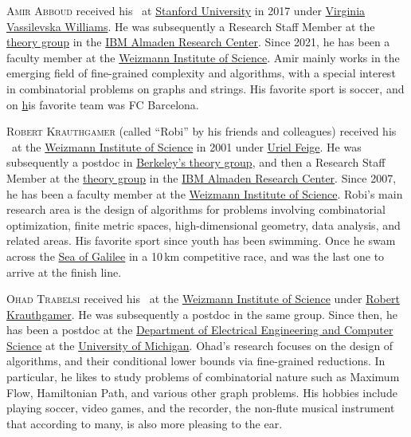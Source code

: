 \documentclass{toc}
\theoremstyle{plain}
\begin{document}
%
%
%
%
%
%
%
%
%
%
%
%
%
%
\begin{tocaboutauthors}
\begin{tocabout}[abboud]  %
\textsc{Amir Abboud} received his \phd\ at
\href{https://www.stanford.edu/}{Stanford University} in 2017 under
\href{https://people.csail.mit.edu/virgi/}{Virginia Vassilevska
Williams}.
He was subsequently a Research Staff Member at the
\href{http://www.almaden.ibm.com/software/disciplines/pm/}{theory
group} in the \href{http://www.almaden.ibm.com/}{IBM Almaden Research
  Center}. Since 2021, he
%
has been  %
a faculty member at the
\href{http://www.weizmann.ac.il/}{Weizmann Institute of Science}.
Amir mainly works in the  %
emerging  %
field of fine-grained complexity and
algorithms, with a special interest in combinatorial problems on graphs
and strings.
His favorite sport is soccer, and on
\href{https://en.wikipedia.org/wiki/FC_Barcelona_2%
%
14, 2020}  %
his favorite team was FC Barcelona.
%

\end{tocabout}
\begin{tocabout}[krauthgamer]
  \textsc{Robert Krauthgamer}
(called ``Robi'' by his friends and colleagues) %
received his \phd\ at the \href{http://www.weizmann.ac.il/}{Weizmann Institute of Science} in 2001 under \href{http://www.wisdom.weizmann.ac.il/~feige/}{Uriel Feige}. He was
%
%
subsequently a postdoc in \href{http://www.eecs.berkeley.edu/Research/Areas/THY/}{Berkeley's theory group}, and then a Research Staff Member at the \href{https://researcher.watson.ibm.com/researcher/view_group.php?id=4207}{theory group} in the \href{http://www.almaden.ibm.com/}{IBM Almaden Research Center}. %
Since 2007, he
%
has been   %
a faculty member
at the \href{http://www.weizmann.ac.il/}{Weizmann Institute of Science}.
%
Robi's     %
main research area is the design of algorithms for problems involving combinatorial optimization, finite metric spaces, high-dimensional geometry, data analysis, and related areas. His favorite sport since youth
%
has been   %
%
swimming. Once     %
he swam across the \href{http://en.wikipedia.org/wiki/Sea_of_Galilee}{Sea of Galilee} in a 10\,km competitive race, and was the last one to arrive at the finish line.
\end{tocabout}
\begin{tocabout}[trabelsi]
  \textsc{Ohad Trabelsi} received his \phd\ at the \href{http://www.weizmann.ac.il/}{Weizmann Institute of Science} under \href{http://www.wisdom.weizmann.ac.il/~robi/}{Robert Krauthgamer}. He was subsequently a postdoc in the same group. Since then, he has been a postdoc at the \href{http://eecs.engin.umich.edu/}{Department of Electrical Engineering and Computer Science} %
at %
the \href{http://umich.edu/}{University of Michigan}.
%
Ohad's research focuses on the design of algorithms, and their conditional lower bounds via fine-grained reductions. In particular, he likes to
%
study    %
problems of combinatorial nature such as Maximum Flow, Hamiltonian Path, and various other graph problems.
His hobbies include playing soccer, video games, and the recorder, the non-flute musical instrument that according to many, is also more pleasing to the ear.
\end{tocabout}

\end{tocaboutauthors}
\end{document}
